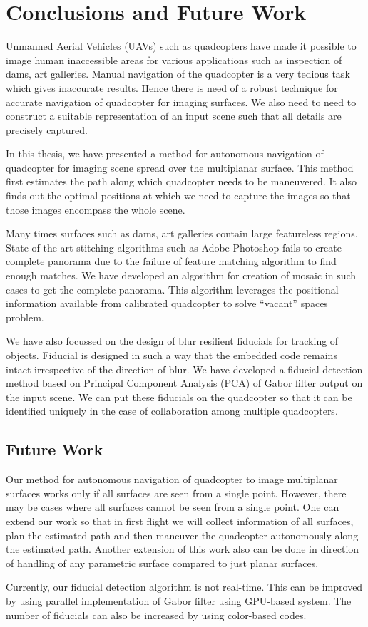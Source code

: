 \chapter{Conclusions and Future Work}
\label{sec:conclusion}
Unmanned Aerial Vehicles (UAVs) such as quadcopters have made it possible to
image human inaccessible areas for various applications such as inspection of
dams, art galleries. Manual navigation of the quadcopter is a very tedious task
which gives inaccurate results. Hence there is need of a robust technique  for
accurate navigation of quadcopter for imaging surfaces. We also need
to need to construct a suitable representation of an input scene such that all
details are precisely captured. 

In this thesis, we have presented a method for autonomous navigation of
quadcopter for imaging scene spread over the multiplanar surface. This method
first estimates the path along which quadcopter needs to be maneuvered. It also
finds out the optimal positions at which we need to capture the images so that
those images encompass the whole scene.

Many times surfaces such as dams, art galleries contain large featureless
regions. State of the art stitching algorithms such as Adobe Photoshop fails to
create complete panorama due to the failure of feature matching algorithm to
find enough matches. We have developed an algorithm for creation of mosaic in such cases to
get the complete panorama. This algorithm leverages the positional information
available from calibrated quadcopter to solve ``vacant'' spaces problem.

We have also focussed on the design of blur resilient fiducials for tracking of
objects. Fiducial is designed in such a way that the embedded code remains
intact irrespective of the direction of blur. We have developed a fiducial
detection method based on Principal Component Analysis (PCA) of Gabor filter
output on the input scene. We can put these fiducials on the quadcopter so that
it can be identified uniquely in the case of collaboration among multiple
quadcopters.

\section{Future Work}
Our method for autonomous navigation of quadcopter to image multiplanar
surfaces works only if all surfaces are seen from a single point. However,
there may be cases where all surfaces cannot be seen from a single point. One
can extend our work so that in first flight we will collect information of all
surfaces, plan the estimated path and then maneuver the quadcopter autonomously
along the estimated path. Another extension of this work also can be done in
direction of handling of any parametric surface compared to just planar
surfaces.

Currently, our fiducial detection algorithm is not real-time. This can be
improved by using parallel implementation of Gabor filter using GPU-based
system. The number of fiducials can also be increased by using color-based
codes.
